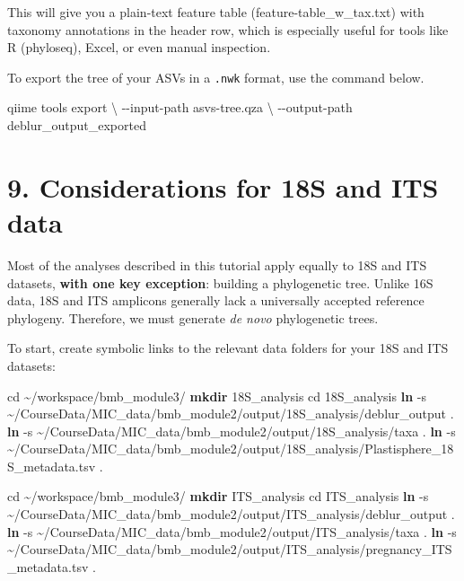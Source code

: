 \documentclass[
]{book}
\newenvironment{Shaded}{\begin{snugshade}}{\end{snugshade}}
\newcommand{\AttributeTok}[1]{\textcolor[rgb]{0.13,0.29,0.53}{#1}}
\newcommand{\BuiltInTok}[1]{#1}
\newcommand{\DataTypeTok}[1]{\textcolor[rgb]{0.13,0.29,0.53}{#1}}
\newcommand{\ExtensionTok}[1]{#1}
\newcommand{\FunctionTok}[1]{\textcolor[rgb]{0.13,0.29,0.53}{\textbf{#1}}}
\newcommand{\NormalTok}[1]{#1}
\begin{document}
This will give you a plain-text feature table (feature-table\_w\_tax.txt) with taxonomy annotations in the header row, which is especially useful for tools like R (phyloseq), Excel, or even manual inspection.

To export the tree of your ASVs in a \texttt{.nwk} format, use the command below.

\begin{Shaded}
\begin{Highlighting}[]
\ExtensionTok{qiime}\NormalTok{ tools export }\DataTypeTok{\textbackslash{}}
  \AttributeTok{{-}{-}input{-}path}\NormalTok{ asvs{-}tree.qza }\DataTypeTok{\textbackslash{}}
  \AttributeTok{{-}{-}output{-}path}\NormalTok{ deblur\_output\_exported}
\end{Highlighting}
\end{Shaded}

\section{9. Considerations for 18S and ITS data}\label{18s-its}

Most of the analyses described in this tutorial apply equally to 18S and ITS datasets, \textbf{with one key exception}: building a phylogenetic tree. Unlike 16S data, 18S and ITS amplicons generally lack a universally accepted reference phylogeny. Therefore, we must generate \emph{de novo} phylogenetic trees.

To start, create symbolic links to the relevant data folders for your 18S and ITS datasets:

\begin{Shaded}
\begin{Highlighting}[]
\BuiltInTok{cd}\NormalTok{ \textasciitilde{}/workspace/bmb\_module3/}
\FunctionTok{mkdir}\NormalTok{ 18S\_analysis}
\BuiltInTok{cd}\NormalTok{ 18S\_analysis}
\FunctionTok{ln} \AttributeTok{{-}s}\NormalTok{ \textasciitilde{}/CourseData/MIC\_data/bmb\_module2/output/18S\_analysis/deblur\_output .}
\FunctionTok{ln} \AttributeTok{{-}s}\NormalTok{ \textasciitilde{}/CourseData/MIC\_data/bmb\_module2/output/18S\_analysis/taxa .}
\FunctionTok{ln} \AttributeTok{{-}s}\NormalTok{ \textasciitilde{}/CourseData/MIC\_data/bmb\_module2/output/18S\_analysis/Plastisphere\_18S\_metadata.tsv .}

\BuiltInTok{cd}\NormalTok{ \textasciitilde{}/workspace/bmb\_module3/}
\FunctionTok{mkdir}\NormalTok{ ITS\_analysis}
\BuiltInTok{cd}\NormalTok{ ITS\_analysis}
\FunctionTok{ln} \AttributeTok{{-}s}\NormalTok{ \textasciitilde{}/CourseData/MIC\_data/bmb\_module2/output/ITS\_analysis/deblur\_output .}
\FunctionTok{ln} \AttributeTok{{-}s}\NormalTok{ \textasciitilde{}/CourseData/MIC\_data/bmb\_module2/output/ITS\_analysis/taxa .}
\FunctionTok{ln} \AttributeTok{{-}s}\NormalTok{ \textasciitilde{}/CourseData/MIC\_data/bmb\_module2/output/ITS\_analysis/pregnancy\_ITS\_metadata.tsv .}
\end{Highlighting}
\end{Shaded}
\end{document}
